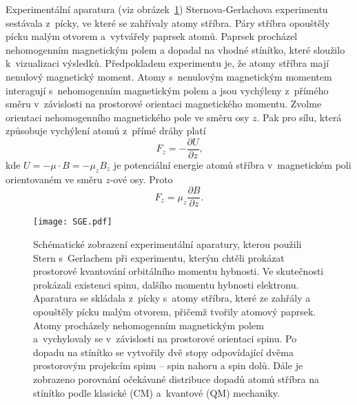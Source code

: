 Experimentální aparatura (viz obrázek~\ref{obr:SCH-experiment}) Sternova-Gerlachova experimentu sestávala z~pícky, ve které se zahřívaly atomy stříbra. Páry stříbra opouštěly pícku malým otvorem a~vytvářely paprsek atomů. Paprsek procházel nehomogenním magnetickým polem a dopadal na vhodné stínítko, které sloužilo k~vizualizaci výsledků. Předpokladem experimentu je, že atomy stříbra mají nenulový magnetický moment. Atomy s~nenulovým magnetickým momentem interagují s~nehomogenním magnetickým polem a jsou vychýleny z~přímého směru v~závislosti na prostorové orientaci magnetického momentu. Zvolme orientaci nehomogenního magnetického pole ve směru osy $z$. Pak pro sílu, která způsobuje vychýlení atomů z~přímé dráhy platí
\begin{equation}
F_z = - \frac{\partial U}{\partial z } \mbox{,}
\label{rov:Spin5}
\end{equation}
kde $U = - \mu \cdot B = - \mu_z B_z$ je potenciální energie atomů stříbra v~magnetickém poli orientovaném ve směru $z$-ové osy. Proto 
\begin{equation}
F_z = \mu_z \frac{\partial B}{\partial z } \mbox{.}
\label{rov:Spin6}
\end{equation}

\begin{figure} [!ht]
\centering
\texttt{[image: SGE.pdf]}
\caption[Sternův - Gerlachův experiment]{Schématické zobrazení experimentální aparatury, kterou použili Stern s~Gerlachem při experimentu, kterým chtěli prokázat prostorové kvantování orbitálního momentu hybnosti. Ve skutečnosti prokázali existenci spinu, dalšího momentu hybnosti elektronu. Aparatura se skládala z~pícky s~atomy stříbra, které ze zahřály a opouštěly pícku malým otvorem, přičemž tvořily atomový paprsek. Atomy procházely nehomogenním magnetickým polem a~vychylovaly se v~závislosti na prostorové orientaci spinu. Po dopadu na stínítko se vytvořily dvě stopy odpovídající dvěma prostorovým projekcím spinu -- spin nahoru a spin dolů. Dále je zobrazeno porovnání očekávané distribuce dopadů atomů stříbra na stínítko podle klasické (CM) a~kvantové (QM) mechaniky.}
\label{obr:SCH-experiment}
\end{figure}


